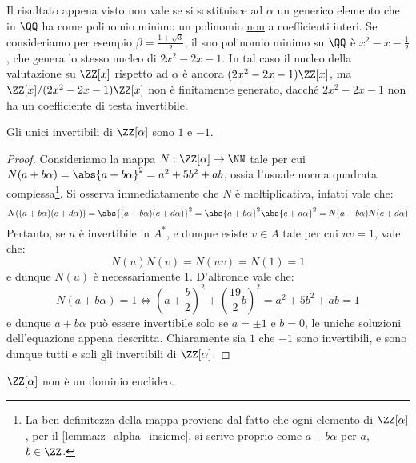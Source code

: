 \documentclass[11pt]{scrartcl}
\begin{document}
	\begin{remark}
		Il risultato appena visto non vale se si sostituisce ad $\alpha$ un
		generico elemento che in $\QQ$ ha come polinomio minimo un polinomio
		\underline{non} a coefficienti interi. Se consideriamo per esempio $\beta = 
		\frac{1 + \sqrt{3}}{2}$,
		il suo polinomio minimo su $\QQ$ è $x^2 - x - \frac 1 2$, che genera
		lo stesso nucleo di $2x^2 - 2x - 1$. In tal caso il nucleo della
		valutazione su $\ZZ[x]$ rispetto ad $\alpha$ è ancora
		$(2x^2 - 2x - 1) \ZZ[x]$, ma $\ZZ[x]/(2x^2 - 2x - 1)\ZZ[x]$ non
		è finitamente generato, dacché $2x^2 - 2x - 1$ non ha un coefficiente
		di testa invertibile.
	\end{remark}
	

	\begin{lemma}
		\label{lemma:z_alpha_invertibili}
		Gli unici invertibili di $\ZZ[\alpha]$ sono $1$ e $-1$.
	\end{lemma}
	
	\begin{proof}
		Consideriamo la mappa $N : \ZZ[\alpha] \to \NN$ tale per
		cui $N(a + b \alpha) = \abs{a + b \alpha}^2 = a^2 + 5 b^2 + ab$, ossia
		l'usuale norma quadrata complessa\footnote{
			La ben definitezza della mappa proviene dal fatto che ogni
			elemento di $\ZZ[\alpha]$, per il \autoref{lemma:z_alpha_insieme},
			si scrive proprio come $a + b \alpha$ per $a$, $b \in \ZZ$.
		}.
		Si osserva immediatamente che $N$ è moltiplicativa, infatti vale che:
		\[ N((a+b\alpha)(c+d\alpha)) = \abs{(a+b\alpha)(c+d\alpha)}^2 = \abs{a+b\alpha}^2 \abs{c+d\alpha}^2 = N(a+b\alpha) N(c+d\alpha) \]
		Pertanto, se $u$ è invertibile in $A^*$, e dunque esiste $v \in A$ tale per
		cui $uv = 1$, vale che:
		\[ N(u) N(v) = N(uv) = N(1) = 1 \]
		e dunque $N(u)$ è necessariamente $1$. D'altronde vale che:
		\[ N(a+b\alpha) = 1 \iff \left( \!a + \frac{b}{2} \right)^2 + \left( \frac{19}{2} b\right)^2 = a^2 + 5 b^2 + ab = 1 \]
		e dunque $a+b\alpha$ può essere invertibile solo se $a = \pm 1$ e $b = 0$,
		le uniche soluzioni dell'equazione appena descritta. Chiaramente sia $1$ che
		$-1$ sono invertibili, e sono dunque tutti e soli gli invertibili di $\ZZ[\alpha]$.
	\end{proof}


	\begin{proposition}
		$\ZZ[\alpha]$ non è un dominio euclideo.
	\end{proposition}
	
\end{document}

